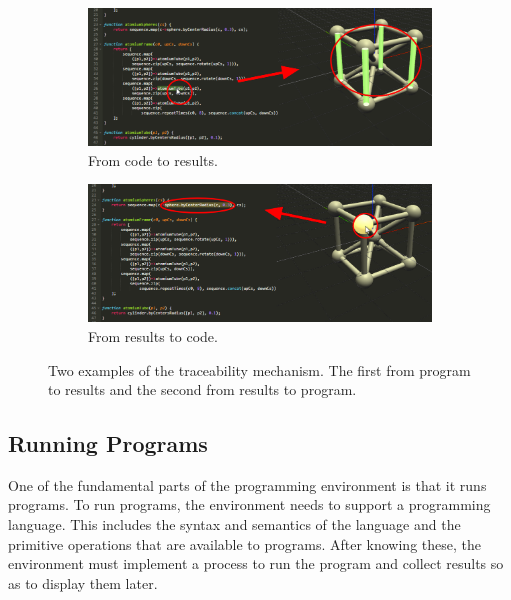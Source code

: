 \begin{figure}
  \centering
  \begin{subfigure}[b]{1.0\textwidth}
    \includegraphics[width=1.0\textwidth]{./images/traceability_example/code_to_results_crop}
    \caption{From code to results.}
    \label{sub:code:to:results}
  \end{subfigure}

  \begin{subfigure}[b]{1.0\textwidth}
    \includegraphics[width=1.0\textwidth]{./images/traceability_example/results_to_code_crop}
    \caption{From results to code.}
    \label{sub:results:to:code}
  \end{subfigure}
  \caption{Two examples of the traceability mechanism. The first from program to results and the second from results to program.}
  \label{fig:trace:example}
\end{figure}


\subsection{Running Programs}
\label{sec:run:progs}
One of the fundamental parts of the programming environment is that it runs programs.
To run programs, the environment needs to support a programming language.
This includes the syntax and semantics of the language and the primitive operations that are available to programs.
After knowing these, the environment must implement a process to run the program and collect results so as to display them later.


